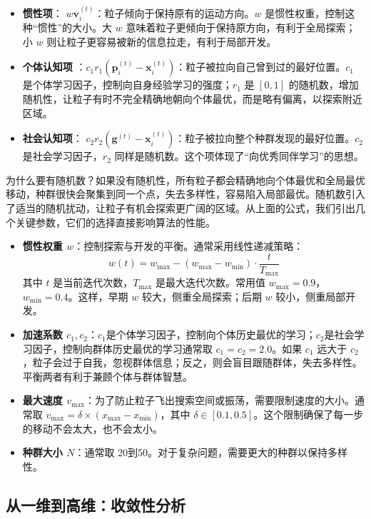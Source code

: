 \documentclass[lang=cn,zihao=-4,a4paper,fontset=windows]{beautybook}
\begin{document}
\begin{itemize}
    \item \textbf{惯性项}： $w \mathbf{v}_i^{(t)}$：粒子倾向于保持原有的运动方向。$w$ 是惯性权重，控制这种“惯性”的大小。大 $w$ 意味着粒子更倾向于保持原方向，有利于全局探索；小 $w$ 则让粒子更容易被新的信息拉走，有利于局部开发。
    \item \textbf{个体认知项} ：$c_1 r_1 (\mathbf{p}_i^{(t)} - \mathbf{x}_i^{(t)})$：粒子被拉向自己曾到过的最好位置。$c_1$ 是个体学习因子，控制向自身经验学习的强度；$r_1$ 是 $[0,1]$ 的随机数，增加随机性，让粒子有时不完全精确地朝向个体最优，而是略有偏离，以探索附近区域。
    \item \textbf{社会认知项}： $c_2 r_2 (\mathbf{g}^{(t)} - \mathbf{x}_i^{(t)})$：粒子被拉向整个种群发现的最好位置。$c_2$ 是社会学习因子，$r_2$ 同样是随机数。这个项体现了“向优秀同伴学习”的思想。
\end{itemize}

为什么要有随机数？如果没有随机性，所有粒子都会精确地向个体最优和全局最优移动，种群很快会聚集到同一个点，失去多样性，容易陷入局部最优。随机数引入了适当的随机扰动，让粒子有机会探索更广阔的区域。从上面的公式，我们引出几个关键参数，它们的选择直接影响算法的性能。
\begin{itemize}
\item \textbf{惯性权重 $w$}：控制探索与开发的平衡。通常采用线性递减策略：
\[
w(t) = w_{\max} - (w_{\max} - w_{\min}) \cdot \frac{t}{T_{\max}}
\]
其中 $t$ 是当前迭代次数，$T_{\max}$ 是最大迭代次数。常用值 $w_{\max}=0.9$，$w_{\min}=0.4$。这样，早期 $w$ 较大，侧重全局探索；后期 $w$ 较小，侧重局部开发。
\item \textbf{加速系数 $c_1, c_2$}：$c_1$是个体学习因子，控制向个体历史最优的学习；$c_2$是社会学习因子，控制向群体历史最优的学习通常取 $c_1 = c_2 = 2.0$。如果 $c_1$ 远大于 $c_2$，粒子会过于自我，忽视群体信息；反之，则会盲目跟随群体，失去多样性。平衡两者有利于兼顾个体与群体智慧。
\item \textbf{最大速度 $v_{\max}$}：为了防止粒子飞出搜索空间或振荡，需要限制速度的大小。通常取 $v_{\max} = \delta \times (x_{\max} - x_{\min})$，其中 $\delta \in [0.1, 0.5]$。这个限制确保了每一步的移动不会太大，也不会太小。
\item \textbf{种群大小 $N$}：通常取 20到50。对于复杂问题，需要更大的种群以保持多样性。
\end{itemize}

\subsection{从一维到高维：收敛性分析}
\end{document}
